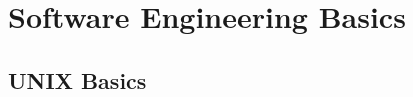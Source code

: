 











\chapter{Software Engineering Basics}
\label{chp:SWEngrBasics}


\section{UNIX Basics}
\label{chp:UNIXBasics}

